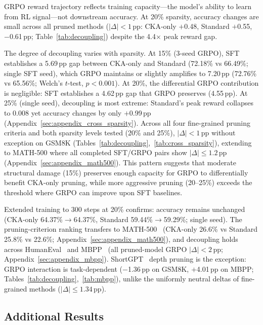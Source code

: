 GRPO reward trajectory reflects training capacity---the model's ability to learn from RL signal---not downstream accuracy.
At 20\% sparsity, accuracy changes are small across all pruned methods ($|\Delta| < 1$\,pp: CKA-only $+$0.48, Standard $+$0.55, \rasp{} $-$0.61\,pp; Table~\ref{tab:decoupling}) despite the 4.4$\times$ peak reward gap.

The degree of decoupling varies with sparsity.
At 15\% (3-seed GRPO), SFT establishes a 5.69\,pp gap between CKA-only and Standard (72.18\% vs 66.49\%; single SFT seed), which GRPO maintains or slightly amplifies to 7.20\,pp (72.76\% vs 65.56\%; Welch's $t$-test, $p{<}0.001$).
At 20\%, the differential GRPO contribution is negligible: SFT establishes a 4.62\,pp gap that GRPO preserves (4.55\,pp).
At 25\% (single seed), decoupling is most extreme: Standard's peak reward collapses to 0.008 yet accuracy changes by only $+$0.99\,pp (Appendix~\ref{sec:appendix_cross_sparsity}).
Across all four fine-grained pruning criteria and both sparsity levels tested (20\% and 25\%), $|\Delta| < 1$\,pp without exception on GSM8K (Tables~\ref{tab:decoupling},~\ref{tab:cross_sparsity}), extending to MATH-500 where all completed SFT/GRPO pairs show $|\Delta| \leq 1.2$\,pp (Appendix~\ref{sec:appendix_math500}).
This pattern suggests that moderate structural damage (15\%) preserves enough capacity for GRPO to differentially benefit CKA-only pruning, while more aggressive pruning (20--25\%) exceeds the threshold where GRPO can improve upon SFT baselines.

Extended training to 300 steps at 20\% confirms: accuracy remains unchanged (CKA-only 64.37\%$\to$64.37\%, Standard 59.44\%$\to$59.29\%; single seed).
The pruning-criterion ranking transfers to MATH-500~\citep{hendrycks2021math} (CKA-only 26.6\% vs Standard 25.8\% vs \rasp{} 22.6\%; Appendix~\ref{sec:appendix_math500}), and decoupling holds across HumanEval~\citep{chen2021humaneval} and MBPP~\citep{austin2021mbpp} (all pruned-model GRPO $|\Delta| < 2$\,pp; Appendix~\ref{sec:appendix_mbpp}).
\label{sec:ood}
ShortGPT~\citep{shortgpt2024} depth pruning is the exception: GRPO interaction is task-dependent ($-$1.36\,pp on GSM8K, $+$4.01\,pp on MBPP; Tables~\ref{tab:decoupling},~\ref{tab:mbpp}), unlike the uniformly neutral deltas of fine-grained methods ($|\Delta| \leq 1.34$\,pp).


\subsection{Additional Results}
\label{sec:additional_results}

